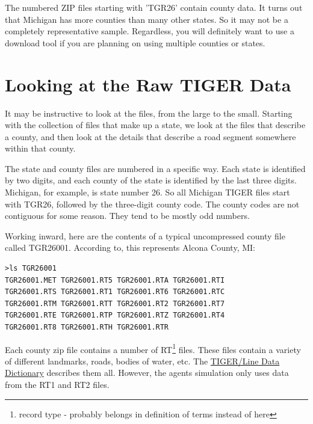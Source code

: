 \documentclass[11pt,letterpaper,onecolumn,twoside,openright,final]{report}
\begin{document}

The numbered ZIP files starting with 'TGR26' contain county data.
It turns out that Michigan has more counties than many other states.
So it may not be a completely representative sample.
Regardless, you will definitely want to use a download tool if you are planning on using multiple counties or states.

\section{Looking at the Raw TIGER Data}
It may be instructive to look at the files, from the large to the small.
Starting with the collection of files that make up a state, we look at the files that describe a county, and then look at the details that describe a road segment somewhere within that county.

The state and county files are numbered in a specific way.
Each state is identified by two digits, and each county of the state is identified by the last three digits.
Michigan, for example, is state number 26.
So all Michigan TIGER files start with TGR26, followed by the three-digit county code.
The county codes are not contiguous for some reason.
They tend to be mostly odd numbers.

Working inward, here are the contents of a typical uncompressed county file called TGR26001.
According to, this represents Alcona County, MI:


\begin{verbatim}
>ls TGR26001
TGR26001.MET TGR26001.RT5 TGR26001.RTA TGR26001.RTI
TGR26001.RTS TGR26001.RT1 TGR26001.RT6 TGR26001.RTC
TGR26001.RTM TGR26001.RTT TGR26001.RT2 TGR26001.RT7
TGR26001.RTE TGR26001.RTP TGR26001.RTZ TGR26001.RT4
TGR26001.RT8 TGR26001.RTH TGR26001.RTR
\end{verbatim}


Each county zip file contains a number of RT\footnote{record type - probably belongs in definition of terms instead of here} files.
These files contain a variety of different landmarks, roads, bodies of water, etc.
The \href{http://www.census.gov/geo/www/tiger/tiger2006se/a6sech6.txt}{TIGER/Line Data Dictionary} describes them all.
However, the agents simulation only uses data from the RT1 and RT2 files.
\end{document}
